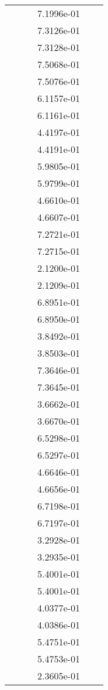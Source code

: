 \begin{xltabular}{\textwidth}{r|rS[table-format=1.3e+2]S[table-format=1.4e+2]S[table-format=1.4e+2]S[table-format=-1.5]}
&  &  & 7.1996e-01 & & \\
&  &  & 7.3126e-01 & & \\
&  &  & 7.3128e-01 & & \\
&  &  & 7.5068e-01 & & \\
&  &  & 7.5076e-01 & & \\
&  &  & 6.1157e-01 & & \\
&  &  & 6.1161e-01 & & \\
&  &  & 4.4197e-01 & & \\
&  &  & 4.4191e-01 & & \\
&  &  & 5.9805e-01 & & \\
&  &  & 5.9799e-01 & & \\
&  &  & 4.6610e-01 & & \\
&  &  & 4.6607e-01 & & \\
&  &  & 7.2721e-01 & & \\
&  &  & 7.2715e-01 & & \\
&  &  & 2.1200e-01 & & \\
&  &  & 2.1209e-01 & & \\
&  &  & 6.8951e-01 & & \\
&  &  & 6.8950e-01 & & \\
&  &  & 3.8492e-01 & & \\
&  &  & 3.8503e-01 & & \\
&  &  & 7.3646e-01 & & \\
&  &  & 7.3645e-01 & & \\
&  &  & 3.6662e-01 & & \\
&  &  & 3.6670e-01 & & \\
&  &  & 6.5298e-01 & & \\
&  &  & 6.5297e-01 & & \\
&  &  & 4.6646e-01 & & \\
&  &  & 4.6656e-01 & & \\
&  &  & 6.7198e-01 & & \\
&  &  & 6.7197e-01 & & \\
&  &  & 3.2928e-01 & & \\
&  &  & 3.2935e-01 & & \\
&  &  & 5.4001e-01 & & \\
&  &  & 5.4001e-01 & & \\
&  &  & 4.0377e-01 & & \\
&  &  & 4.0386e-01 & & \\
&  &  & 5.4751e-01 & & \\
&  &  & 5.4753e-01 & & \\
&  &  & 2.3605e-01 & & \\

\end{xltabular}
